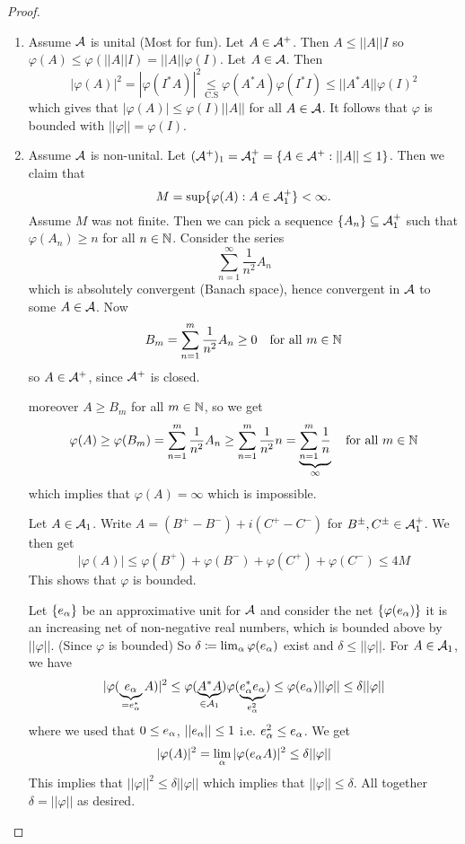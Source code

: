\documentclass[10pt,english,a4paper]{article}
\theoremstyle{definition}
\begin{document}
\begin{proof}
\begin{enumerate}[(1)]
    \item 
    Assume $\mathcal{A}$ is unital (Most for fun). Let $A \in \mathcal{A}^+$. Then $A \leq ||A||I$
so $\varphi(A)\leq \varphi(||A|| I) = ||A|| \varphi(I)$. Let $A \in \mathcal{A}$. 
Then 
\[|\varphi(A)|^2 = |\varphi(I^*A)|^2 \underset{\text{C.S}}{\leq} 
\varphi(A^*A)\varphi(I^*I) \leq ||A^*A||\varphi(I)^2\]
which gives that $|\varphi(A)|\leq \varphi(I)||A||$ for all $A \in \mathcal{A}$. 
It follows that $\varphi$ is bounded with $||\varphi|| = \varphi(I)$.

\item Assume $\mathcal{A}$ is non-unital. Let $(\mathcal{A}^+)_1 = \mathcal{A}_{1}^{+} = \{A \in \mathcal{A}^+: ||A||\leq 1\}$.
Then we claim that 
\[ M = \sup\{ \varphi(A) : A \in \mathcal{A}^{+}_{1} \}< \infty. \]
Assume $M$ was not finite. Then we can pick a sequence $\{A_n\} \subseteq \mathcal{A}_{1}^{+}$
such that $\varphi(A_n) \geq n$ for all $n \in \mathbb{N}$. Consider the series 
\[ \sum_{n=1}^{\infty}\frac{1}{n^2} A_n \]
which is absolutely convergent (Banach space), hence convergent in $\mathcal{A}$ to some $A \in \mathcal{A}$.
Now 
\[B_m = \sum_{n=1}^{m}\frac{1}{n^2}A_n \geq 0 \quad \text{for all }m \in \mathbb{N}\]
so $A \in \mathcal{A}^+$, since $\mathcal{A}^+$ is closed. 

moreover $A \geq B_m$ for all $m \in \mathbb{N}$, so we get 
\[\varphi(A)\geq \varphi(B_m) = \sum_{n=1}^{m} \frac{1}{n^2}A_n \geq \sum_{n=1}^{m} 
\frac{1}{n^2}n  = \underbrace{\sum_{n=1}^{m} \frac{1}{n}}_{\infty} \quad \text{for all }m\in \mathbb{N}  \]
which implies that $\varphi(A)=\infty$ which is impossible. 

Let $A \in \mathcal{A}_1$. Write $A = (B^+-B^-) + i (C^+-C^-)$ for $B^{\pm},C^{\pm}\in \mathcal{A}_{1}^{+}$.
We then get 
\[ |\varphi(A)| \leq \varphi(B^+) + \varphi(B^-) + \varphi(C^+) + \varphi(C^-)\leq 4M\]
This shows that $\varphi$ is bounded. 

Let $\{e_{\alpha}\}$ be an approximative unit for $\mathcal{A}$ and consider the net 
$\{\varphi(e_{\alpha})\}$ it is an increasing net of non-negative real numbers, which 
is bounded above by $||\varphi||$. (Since $\varphi$ is bounded) So $
\delta \coloneqq \lim_{\alpha} \varphi(e_{\alpha})$ exist and $\delta \leq ||\varphi||$.
For $A \in \mathcal{A}_1$, we have 
\[|\varphi(\underbrace{e_{\alpha}}_{=e_{\alpha}^{*}}A)|^2\leq \varphi(\underbrace{A^*A}_{\in
\mathcal{A}_1})\varphi(\underbrace{e_{\alpha}^*e_{\alpha}}_{e_{\alpha}^{2}}) \leq
\varphi(e_{\alpha})||\varphi||\leq \delta ||\varphi||\]
where we used that $0 \leq e_{\alpha}$, $||e_{\alpha}|| \leq 1$ i.e. $e_{\alpha}^{2}\leq e_{\alpha}$.
We get 
\[ |\varphi(A)|^2 = \lim_{\alpha}|\varphi(e_{\alpha}A)|^2 \leq \delta||\varphi|| \]
This implies that $||\varphi||^2 \leq \delta ||\varphi||$ which  implies that
$||\varphi||\leq \delta$. All together $\delta = ||\varphi||$ as desired. 
\end{enumerate}
\end{proof}
\end{document}
